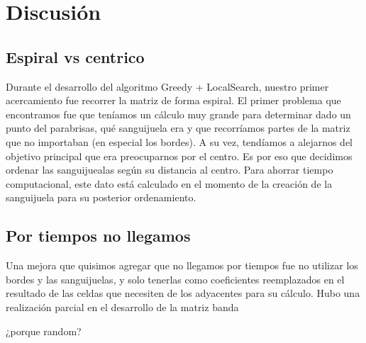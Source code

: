 \section{Discusi\'on}

\subsection{Espiral vs centrico}
	Durante el desarrollo del algoritmo Greedy + LocalSearch, nuestro primer acercamiento fue recorrer la matriz de forma espiral. El primer problema que encontramos fue que teníamos un cálculo muy grande para determinar dado un punto del parabrisas, qué sanguijuela era y que recorríamos partes de la matriz que no importaban (en especial los bordes). A su vez, tendíamos a alejarnos del objetivo principal que era preocuparnos por el centro. Es por eso que decidimos ordenar las sanguijuealas según su distancia al centro. Para ahorrar tiempo computacional, este dato está calculado en el momento de la creación de la sanguijuela para su posterior ordenamiento.


\subsection{Por tiempos no llegamos}
  Una mejora que quisimos agregar que no llegamos por tiempos fue no utilizar los bordes y las sanguijuelas, y solo tenerlas como coeficientes reemplazados en el resultado de las celdas que necesiten de los adyacentes para su cálculo. Hubo una realización parcial en el desarrollo de la matriz banda


¿porque random?







